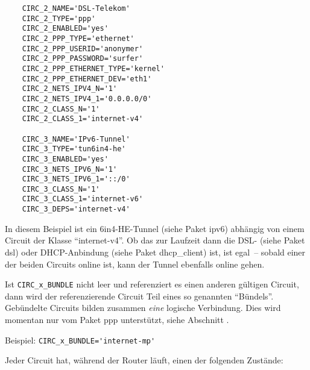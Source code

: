 \begin{description}
\begin{example}
\begin{verbatim}
    CIRC_2_NAME='DSL-Telekom'
    CIRC_2_TYPE='ppp'
    CIRC_2_ENABLED='yes'
    CIRC_2_PPP_TYPE='ethernet'
    CIRC_2_PPP_USERID='anonymer'
    CIRC_2_PPP_PASSWORD='surfer'
    CIRC_2_PPP_ETHERNET_TYPE='kernel'
    CIRC_2_PPP_ETHERNET_DEV='eth1'
    CIRC_2_NETS_IPV4_N='1'
    CIRC_2_NETS_IPV4_1='0.0.0.0/0'
    CIRC_2_CLASS_N='1'
    CIRC_2_CLASS_1='internet-v4'

    CIRC_3_NAME='IPv6-Tunnel'
    CIRC_3_TYPE='tun6in4-he'
    CIRC_3_ENABLED='yes'
    CIRC_3_NETS_IPV6_N='1'
    CIRC_3_NETS_IPV6_1='::/0'
    CIRC_3_CLASS_N='1'
    CIRC_3_CLASS_1='internet-v6'
    CIRC_3_DEPS='internet-v4'
\end{verbatim}
\end{example}

In diesem Beispiel ist ein 6in4-HE-Tunnel (siehe Paket ipv6) abhängig von
einem Circuit der Klasse ``internet-v4''. Ob das zur Laufzeit dann die
DSL- (siehe Paket dsl) oder DHCP-Anbindung (siehe Paket dhcp\_client) ist, ist
egal~-- sobald einer der beiden Circuits online ist, kann der Tunnel ebenfalls
online gehen.


Ist \verb+CIRC_x_BUNDLE+ nicht leer und referenziert es einen anderen gültigen
Circuit, dann wird der referenzierende Circuit Teil eines so genannten
``Bündels''. Gebündelte Circuits bilden zusammen \emph{eine} logische
Verbindung. Dies wird momentan nur vom Paket ppp unterstützt, siehe
Abschnitt .

Beispiel: \verb+CIRC_x_BUNDLE='internet-mp'+

\end{description}


Jeder Circuit hat, während der Router läuft, einen der folgenden Zustände:

